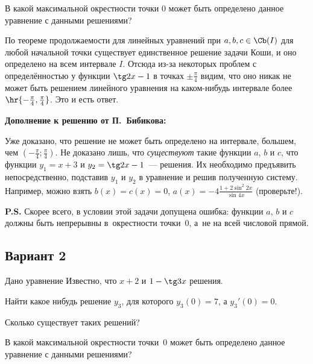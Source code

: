 \documentclass{article}
\begin{document}
\begin{problem}[4 балла]
  В какой максимальной окрестности точки $0$ может быть определено данное уравнение с данными
  решениями?
\end{problem}
\begin{solution}
  По теореме продолжаемости для линейных уравнений при $a,b,c \in \Cb(I)$ для любой начальной точки существует
  единственное решение задачи Коши, и оно определено на всем интервале $I$. Отсюда из-за некоторых проблем с
  определённостью у функции $\tg2x-1$  в точках $\pm \frac\pi4$ видим, что оно никак не может быть
  решением линейного уравнения на каком-нибудь интервале более $\hr{-\frac\pi4, \frac\pi4}$. Это и есть ответ.

  \textbf{Дополнение к решению от П.~Бибикова:}

  Уже доказано, что решение не может быть определено на интервале,
  большем, чем $\left(-\frac{\pi}{4}; \frac{\pi}{4}\right)$. Не
  доказано лишь, что \emph{существуют} такие функции $a$, $b$ и $c$,
  что функции $y_1=x+3$ и $y_2=\tg 2x-1$~--- решения. Их необходимо
  предъявить непосредственно, подставив $y_1$ и $y_2$ в уравнение и
  решив полученную систему. Например, можно взять $b(x)=c(x)=0$,
  $a(x)=-4\frac{1+2\sin^2 2x}{\sin 4x}$ (проверьте!).

  \textbf{P.S.} Скорее всего, в условии этой задачи допущена ошибка: функции
  $a$, $b$ и $c$ должны быть непрерывны в~окрестности точки~$0$, а~не на
  всей числовой прямой.
\end{solution}

\setcounter{problem}{0}
\subsection{Вариант 2}

Дано уравнение  Известно, что
$x+2$ и $1 - \tg 3x$ решения.

\begin{problem}[2 балла]
  Найти какое нибудь решение $y_3$, для которого $y_3(0)=7$, а $y_3'(0) = 0$.
\end{problem}

\begin{problem}[2 балла]
  Сколько существует таких решений?
\end{problem}

\begin{problem}[4 балла]
  В какой максимальной окрестности точки~$0$ может быть определено данное уравнение с данными
  решениями?
\end{problem}
\end{document}
